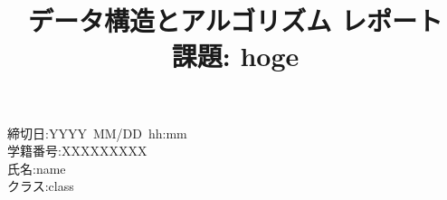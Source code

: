\documentclass[10pt]{article}
\title{\bf データ構造とアルゴリズム レポート \\ 課題: hoge}
\author{}
\date{}
\renewcommand{\lstlistingname}{\noindent\textgt{}}
\begin{document}
\maketitle

\begin{description}
	\item[\rm \large 締切日:YYYY\, MM/DD\, hh:mm]
	\item[\rm \large 学籍番号:XXXXXXXXX]
	\item[\rm \large 氏名:name]
	\item[\rm \large クラス:class]
\end{description}

\section{}

% 
\end{document}
